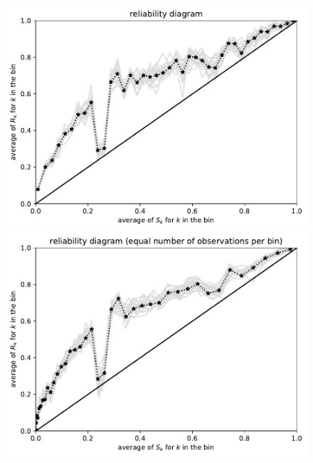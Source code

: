 \documentclass{article}
\begin{document}
\begin{figure}
\begin{centering}
\parbox{\imsize}{\includegraphics[width=\imsize]
                {./codes/unweighted/10000_40_1_2/equiprob.pdf}}
\quad\quad
\parbox{\imsize}{\includegraphics[width=\imsize]
                {./codes/unweighted/10000_40_1_2/equisamp.pdf}}

\vspace{\vertsep}


\end{centering}
\end{figure}
\end{document}
